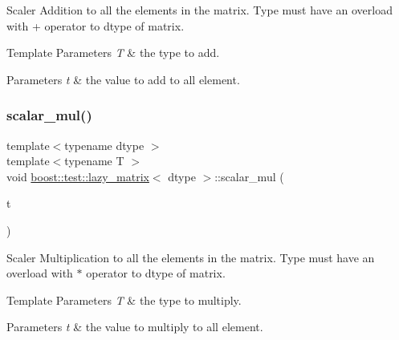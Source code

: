 Scaler Addition to all the elements in the matrix. Type must have an overload with + operator to dtype of matrix. 


\begin{DoxyTemplParams}{Template Parameters}
{\em T} & the type to add. \\
\hline
\end{DoxyTemplParams}

\begin{DoxyParams}{Parameters}
{\em t} & the value to add to all element. \\
\hline
\end{DoxyParams}
\mbox{\label{classboost_1_1test_1_1lazy__matrix_a2ae5fb3fb4df67fe12f20f63b041e672}} 
\subsubsection{\texorpdfstring{scalar\_mul()}{scalar\_mul()}}
{\footnotesize\ttfamily template$<$typename dtype $>$ \\
template$<$typename T $>$ \\
void \mbox{\hyperlink{classboost_1_1test_1_1lazy__matrix}{boost\+::test\+::lazy\+\_\+matrix}}$<$ dtype $>$\+::scalar\+\_\+mul (\begin{DoxyParamCaption}\item[{T}]{t }\end{DoxyParamCaption})\hspace{0.3cm}{\ttfamily [inline]}}



Scaler Multiplication to all the elements in the matrix. Type must have an overload with $\ast$ operator to dtype of matrix. 


\begin{DoxyTemplParams}{Template Parameters}
{\em T} & the type to multiply. \\
\hline
\end{DoxyTemplParams}

\begin{DoxyParams}{Parameters}
{\em t} & the value to multiply to all element. \\
\hline
\end{DoxyParams}
\mbox{\label{classboost_1_1test_1_1lazy__matrix_ae47fb3f2e5ed004216f6d1f8b7fddf8d}} 
